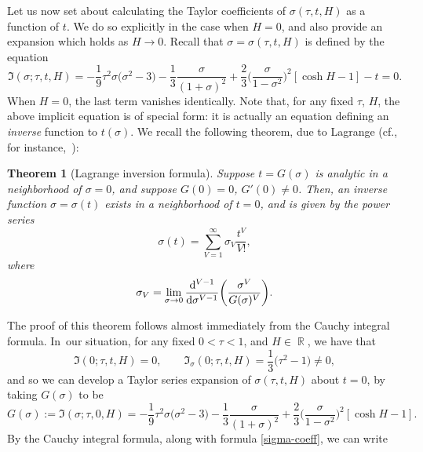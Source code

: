 \documentclass[10pt,a4paper]{amsart}
\DeclareMathOperator{\RR}{\mathbb{R}}
\numberwithin{equation}{section}
\newtheorem{Theorem}{Theorem}[section]
\begin{document}
Let us now set about calculating the Taylor coefficients of $\sigma(\tau,t,H)$ as a function of $t$. We do so explicitly in the case when
$H=0$, and also provide an expansion which holds as $H\to 0$. Recall that $\sigma = \sigma(\tau,t,H)$ is defined by the equation
 \begin{equation*}
 \mathfrak{I}(\sigma;\tau,t,H) = -\frac{1}{9}\tau^2\sigma \bigl(\sigma^2 - 3\bigr) -\frac{1}{3}\frac{\sigma}{(1+\sigma)^2} + \frac{2}{3}\biggl(\frac{\sigma}{1-\sigma^2}\biggr)^2[\cosh H -1] - t = 0.
 \end{equation*}
When $H=0$, the last term vanishes identically. Note that, for any fixed $\tau$, $H$, the above implicit equation is of special form: it
is actually an equation defining an \textit{inverse} function to $t(\sigma)$.
We recall the following theorem, due to Lagrange (cf., for instance,~\cite[p.~149, Exercise~25]{WW}):
 \begin{Theorem}[Lagrange inversion formula]
 Suppose $t = G(\sigma)$ is analytic in a neighborhood of $\sigma= 0$, and suppose $G(0) = 0$, $G'(0) \neq 0$. Then, an inverse function $\sigma = \sigma(t)$ exists in a neighborhood of $t = 0$, and is given by the power series
 \begin{equation*}
 \sigma(t) = \sum_{V=1}^{\infty} \sigma_V \frac{t^V}{V!},
 \end{equation*}
 where
 \begin{equation}\label{sigma-coeff}
 \sigma_V = \lim_{\sigma\to 0}\frac{{\rm d}^{V-1}}{{\rm d}\sigma^{V-1}} \biggl(\frac{\sigma^V}{G(\sigma)^V}\biggr).
 \end{equation}
 \end{Theorem}
The proof of this theorem follows almost immediately from the Cauchy integral formula. In~our situation, for any fixed $0<\tau<1$,
and $H\in \RR$, we have that
 \begin{equation*}
 \mathfrak{I}(0;\tau,t,H) = 0,\qquad \mathfrak{I}_\sigma(0;\tau,t,H) = \frac{1}{3}\bigl(\tau^2-1\bigr) \neq 0,
 \end{equation*}
and so we can develop a Taylor series expansion of $\sigma(\tau,t,H)$ about $t=0$, by taking $G(\sigma)$ to be
 \begin{equation*}
 G(\sigma) := \mathfrak{I}(\sigma;\tau,0,H) = -\frac{1}{9}\tau^2\sigma \bigl(\sigma^2 - 3\bigr) -\frac{1}{3}\frac{\sigma}{(1+\sigma)^2} + \frac{2}{3}\biggl(\frac{\sigma}{1-\sigma^2}\biggr)^2[\cosh H -1].
 \end{equation*}
By the Cauchy integral formula, along with formula \eqref{sigma-coeff}, we can write
\end{document}
